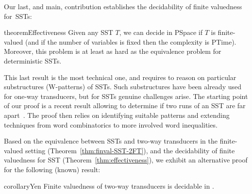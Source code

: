 \documentclass{article}
\newcommand{\RestateRemark}[1]{{\normalfont\bfseries #1}}
\newcommand{\RestateInit}[1]{\newcommand{#1}{}}
\begin{document}
    Our last, and main, contribution establishes the decidability
    of finite valuedness for~SSTs:%


\RestateInit{\restateEffectiveness}

\begin{restatable}{theorem}{Effectiveness}
	\label{thm:effectiveness}\RestateRemark{\restateEffectiveness}
      Given any SST $T$, we can decide in {\upshape\sc PSpace}
      if $T$ is
      finite-valued (and if the number of variables
      is fixed then the complexity is {\upshape\sc PTime}). 
      Moreover, this problem is at least as hard as the
      equivalence problem for deterministic SSTs. 
    \end{restatable}


    This last result is the most technical one, and requires to reason
    on particular substructures (W-patterns) of SSTs.
    Such substructures %
    have  been already  used for one-way transducers, 
    but for SSTs genuine challenges arise.
    The starting point of our  proof is a
    recent result allowing to determine if two runs of
    an SST are
    far apart~\cite{SSTdelay}.
    The proof then relies on identifying suitable patterns and
    extending techniques from word combinatorics to more involved
    word inequalities. 
    



    Based on the equivalence between SSTs and two-way transducers in the
    finite-valued setting (Theorem~\ref{thm:finval-SST-2FT}), and the
    decidability of finite valuedness for SST
    (Theorem~\ref{thm:effectiveness}), we exhibit 
    an alternative proof for the following (known)
    result:

  
    \RestateInit{\restateYen}
\begin{restatable}{corollary}{Yen}
	  \label{thm:finval-twoway}\RestateRemark{\restateYen}
      Finite valuedness of two-way transducers is decidable in .
    \end{restatable}
\end{document}
